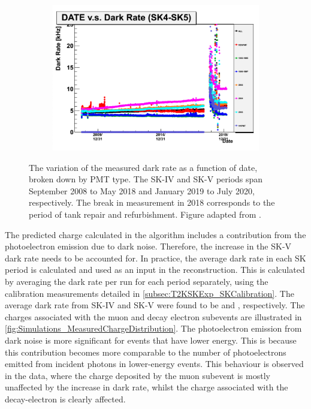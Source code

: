 \begin{figure}[h]
  \begin{subfigure}[t]{\textwidth}
    \includegraphics[width=\textwidth, trim={0mm 0mm 0mm 0mm}, clip, page=1]{Figures/Simulations/DarkRate.pdf}
  \end{subfigure}
  \caption{The variation of the measured dark rate as a function of date, broken down by PMT type. The SK-IV and SK-V periods span September 2008 to May 2018 and January 2019 to July 2020, respectively. The break in measurement in 2018 corresponds to the period of tank repair and refurbishment. Figure adapted from \cite{t2k_tn_399}.}
  \label{fig:Simulations_DarkRateVariation}
\end{figure}

The predicted charge calculated in the \fq algorithm includes a contribution from the photoelectron emission due to dark noise. Therefore, the increase in the SK-V dark rate needs to be accounted for. In practice, the average dark rate in each SK period is calculated and used as an input in the reconstruction. This is calculated by averaging the dark rate per run for each period separately, using the calibration measurements detailed in \autoref{subsec:T2KSKExp_SKCalibration}. The average dark rate from SK-IV and SK-V were found to be  and , respectively. The charges associated with the muon and decay electron subevents are illustrated in \autoref{fig:Simulations_MeasuredChargeDistribution}. The photoelectron emission from dark noise is more significant for events that have lower energy. This is because this contribution becomes more comparable to the number of photoelectrons emitted from incident photons in lower-energy events. This behaviour is observed in the data, where the charge deposited by the muon subevent is mostly unaffected by the increase in dark rate, whilst the charge associated with the decay-electron is clearly affected.

